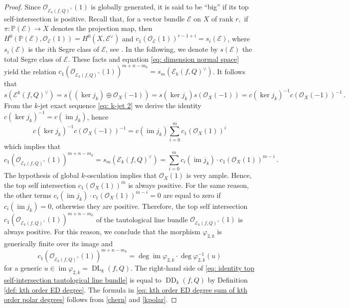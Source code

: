 \documentclass[11pt,reqno]{amsart}
\numberwithin{equation}{section}
\theoremstyle{plain}
\numberwithin{theorem}{section}
\theoremstyle{definition}
\renewcommand{\P}{\mathbb{P}}
\newcommand{\EE}{\mathcal{E}}
\newcommand{\OO}{\mathcal{O}}
\newcommand{\DL}{\operatorname{DL}}
\newcommand{\DD}{\operatorname{DD}}
\newcommand{\image}{\operatorname{im}}
\begin{document}
\begin{proof}
Since $\OO_{\EE_k(f,Q)^\vee}(1)$ is globally generated, it is said to be ``big'' if its top self-intersection is positive.
Recall that, for a vector bundle $\EE$ on $X$ of rank $r,$ if $\pi\colon\P(\EE)\to X$ denotes the projection map, then $H^0(\P(\EE),\OO_\EE(1))=H^0(X,\EE^\vee)$ and $c_1(\OO_\EE(1))^{r-1+i}=s_i(\EE)$, where $s_i(\EE)$ is the $i$th Segre class of $\EE$, see \cite{fulton1998intersection}. In the following, we denote by $s(\EE)$ the total Segre class of $\EE$. These facts and equation \eqref{eq: dimension normal space} yield the relation $c_1(\OO_{\EE_k(f,Q)^\vee}(1))^{m+n-m_k}=s_{m}(\EE_k(f,Q)^\vee)$. It follows that
\[
s(\EE^k(f,Q)^\vee) = s((\ker j_k)\oplus\OO_X(-1)) = s(\ker j_k)s(\OO_X(-1)) = c(\ker j_k)^{-1}c(\OO_X(-1))^{-1}\,.
\]
From the $k$-jet exact sequence \eqref{eq: k-jet 2} we derive the identity $c(\ker j_k)^{-1}=c(\image j_k)$, hence
\begin{equation}\label{chern}
c(\ker j_k)^{-1}c(\OO_X(-1))^{-1}=c(\image j_k)\sum_{i=0}^m c_1(\OO_X(1))^i  
\end{equation}
which implies that
\begin{equation}\label{kpolar}
c_1(\OO_{\EE_k(f,Q)^\vee}(1))^{m+n-m_k}=s_m(\EE_k(f,Q)^\vee)=\sum_{i=0}^m c_i(\image j_k)\cdot c_1(\OO_X(1))^{m-i}\,.
\end{equation}
The hypothesis of global $k$-osculation implies that $\OO_X(1)$ is very ample. Hence, the top self intersection $c_1(\OO_X(1))^{m}$ is always positive. For the same reason, the other terms $c_i(\image j_k)\cdot c_1(\OO_X(1))^{m-i}=0$ are equal to zero if $c_i(\image j_k)=0$, otherwise they are positive. Therefore, the top self intersection $c_1(\OO_{\EE_k(f,Q)^\vee}(1))^{m+n-m_k}$ of the tautological line bundle $\OO_{\EE_k(f,Q)^\vee}(1)$ is always positive. For this reason, we conclude that the morphism $\varphi_{2,k}$ is generically finite over its image and
\begin{equation}\label{eq: identity top self-intersection tautological line bundle}
c_1(\OO_{\EE_k(f,Q)^\vee}(1))^{m+n-m_k} = \deg\image\varphi_{2,k}\cdot\deg\varphi_{2,k}^{-1}(u)
\end{equation}
for a generic $u\in\image\varphi_{2,k}=\DL_k(f,Q)$. The right-hand side of \eqref{eq: identity top self-intersection tautological line bundle} is equal to $\DD_k(f,Q)$ by Definition \ref{def: kth order ED degree}.
The formula in \eqref{eq: kth order ED degree sum of kth order polar degrees} follows from \eqref{chern} and \eqref{kpolar}.
\end{proof}
\end{document}
